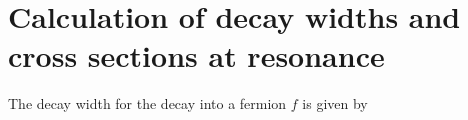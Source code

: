 \section{Calculation of decay widths and cross sections at resonance}
The decay width for the decay into a fermion $f$ is given by 